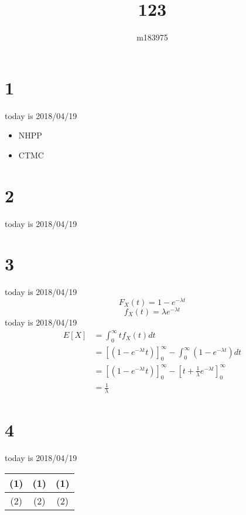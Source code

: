 \documentclass{article}
\title{123}
\author{m183975}
\begin{document}
\maketitle
\section{1}
today is 2018/04/19

\begin{itemize}
  \item NHPP
  \item CTMC
\end{itemize}
\section{2}
today is 2018/04/19 
\section{3}
today is 2018/04/19
\begin{equation}
  F_{X}(t) = 1-e^{-{\lambda}t}
\end{equation}
\begin{equation}
  f_{X}(t) = {\lambda}e^{-{\lambda}t}
\end{equation}
today is 2018/04/19
\begin{equation}
\begin{aligned}
E[X]&=\int_{0}^{\infty}tf_{X}(t)dt\\
&=[(1-e^{-{\lambda}t}t)]^\infty_{0}-\int_{0}^{\infty}(1-e^{-{\lambda}t})dt\\
&=[(1-e^{-{\lambda}t}t)]^\infty_{0}-[t+\frac{1}{\lambda}e^{-{\lambda}t}]^\infty_{0}\\
&=\frac{1}{\lambda}
\end{aligned}
\end{equation}
\section{4}
today is 2018/04/19\\
\begin{table}[!hbt]  
  \centering  
\begin{tabular}{|c|c|c|}
\hline  
(1)&(1)&(1)\\
\hline  
(2)&(2)&(2)\\
\hline 
\end{tabular}
\end{table} 
\end{document}
